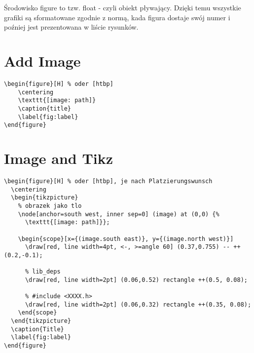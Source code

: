 %
%

\begin{tcolorbox}[red,title={Hinweis}]
Środowisko figure to tzw. float - czyli obiekt pływający. Dzięki temu wszystkie grafiki są sformatowane zgodnie z normą, kada figura dostaje swój numer i poźniej jest prezentowana w liście rysunków.
\end{tcolorbox}


\section{Add Image}
\begin{lstlisting}
\begin{figure}[H] % oder [htbp]
    \centering
    \texttt{[image: path]}
    \caption{title}
    \label{fig:label}
\end{figure}

\end{lstlisting}

\section{Image and Tikz}
\begin{lstlisting}
\begin{figure}[H] % oder [htbp], je nach Platzierungswunsch
  \centering
  \begin{tikzpicture}
    % obrazek jako tlo
    \node[anchor=south west, inner sep=0] (image) at (0,0) {%
      \texttt{[image: path]}};
        
    \begin{scope}[x={(image.south east)}, y={(image.north west)}]
      \draw[red, line width=4pt, <-, >=angle 60] (0.37,0.755) -- ++(0.2,-0.1);
        
      % lib_deps
      \draw[red, line width=2pt] (0.06,0.52) rectangle ++(0.5, 0.08);
        
      % #include <XXXX.h>
      \draw[red, line width=2pt] (0.06,0.32) rectangle ++(0.35, 0.08);
    \end{scope}
  \end{tikzpicture}
  \caption{Title}
  \label{fig:label}
\end{figure}
\end{lstlisting}

